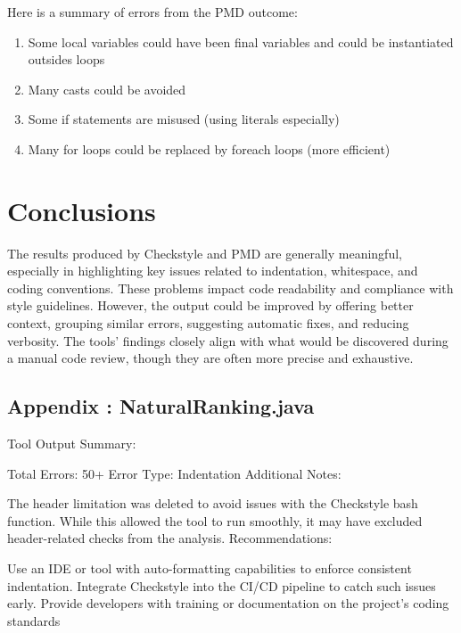 \documentclass[twocolumn,10pt]{article}
\begin{document}
Here is a summary of errors from the PMD outcome:
\begin{enumerate}[itemsep=0pt, topsep=0pt]
    \item Some local variables could have been final variables and could be instantiated outsides loops
    \item Many casts could be avoided 
    \item Some if statements are misused (using literals especially)
    \item Many for loops could be replaced by foreach loops (more efficient)    
\end{enumerate}

\section{Conclusions}

The results produced by Checkstyle and PMD are generally meaningful, especially in highlighting key issues related to indentation, whitespace, and coding conventions. These problems impact code readability and compliance with style guidelines. However, the output could be improved by offering better context, grouping similar errors, suggesting automatic fixes, and reducing verbosity. The tools’ findings closely align with what would be discovered during a manual code review, though they are often more precise and exhaustive.

\newpage

\begin{appendix}
\section{Appendix : NaturalRanking.java}

\end{appendix}

Tool Output Summary:

Total Errors: 50+
Error Type: Indentation
Additional Notes:

The header limitation was deleted to avoid issues with the Checkstyle bash function. While this allowed the tool to run smoothly, it may have excluded header-related checks from the analysis.
Recommendations:

Use an IDE or tool with auto-formatting capabilities to enforce consistent indentation.
Integrate Checkstyle into the CI/CD pipeline to catch such issues early.
Provide developers with training or documentation on the project's coding standards
\end{document}
